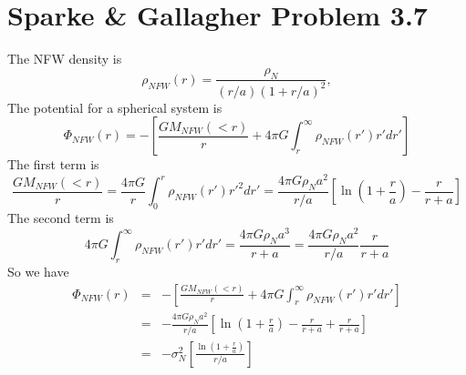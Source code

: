 \documentclass[]{article}
\begin{document}
\section{Sparke \& Gallagher Problem 3.7}
The NFW density is
\begin{equation}
\rho_{NFW}(r) = \frac{\rho_N}{(r/a)(1+r/a)^2},
\end{equation}
\noindent
The potential for a spherical system is
\begin{equation}
\Phi_{NFW}(r) = -\left[\frac{GM_{NFW}(<r)}{r} + 4\pi G\int_{r}^{\infty}\rho_{NFW}(r')r'dr'\right]
\end{equation}
\noindent
The first term is
\begin{equation}
\frac{GM_{NFW}(<r)}{r} = \frac{4\pi G}{r} \int_{0}^{r} \rho_{NFW}(r')r'^2 dr' = \frac{4\pi G \rho_{N} a^2}{r/a}\left[ \ln\left(1+\frac{r}{a}\right) - \frac{r}{r+a}\right]
\end{equation}
\noindent
The second term is
\begin{equation}
4\pi G \int_{r}^{\infty} \rho_{NFW}(r')r'dr' = \frac{4\pi G \rho_{N} a^3}{r+a}= \frac{4\pi G \rho_{N} a^2}{r/a}\frac{r}{r+a}
\end{equation}
\noindent
So we have
\begin{eqnarray}
\Phi_{NFW}(r) &=& -\left[\frac{GM_{NFW}(<r)}{r} + 4\pi G\int_{r}^{\infty}\rho_{NFW}(r')r'dr'\right]\\
&=& - \frac{4\pi G \rho_{N} a^2}{r/a}\left[ \ln\left(1+\frac{r}{a}\right) - \frac{r}{r+a} + \frac{r}{r+a}\right]\\
&=& -\sigma_N^2 \left[ \frac{\ln\left(1+\frac{r}{a}\right)}{r/a}\right]
\end{eqnarray}
\end{document}
